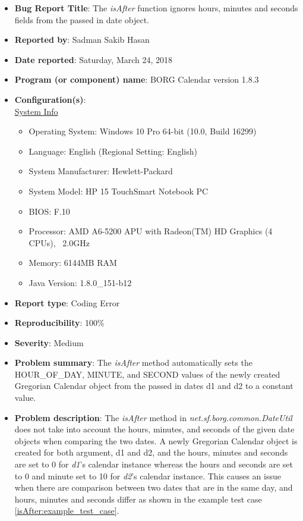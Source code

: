 \documentclass[fontsize=12pt,paper=letter,twoside]{scrartcl}
\begin{document}
\begin{itemize}
\item \textbf{Bug Report Title}: The \emph{isAfter} function ignores hours, minutes and seconds fields from the passed in date object.
\item \textbf{Reported by}: Sadman Sakib Hasan
\item \textbf{Date reported}: Saturday, March 24, 2018
\item \textbf{Program (or component) name}: BORG Calendar version 1.8.3
\item \textbf{Configuration(s)}:\\
\underline{System Info}
\begin{itemize}
\item{Operating System: Windows 10 Pro 64-bit (10.0, Build 16299)}
\item {Language: English (Regional Setting: English)}
\item {System Manufacturer: Hewlett-Packard}
\item {System Model: HP 15 TouchSmart Notebook PC}
\item {BIOS: F.10}
\item {Processor: AMD A6-5200 APU with Radeon(TM) HD Graphics (4 CPUs), ~2.0GHz }
\item {Memory: 6144MB RAM}
\item {Java Version: 1.8.0\_151-b12}
\end{itemize}
\item \textbf{Report type}: Coding Error
\item \textbf{Reproducibility}: 100\%
\item \textbf{Severity}: Medium
\item \textbf{Problem summary}: The \emph{isAfter} method automatically sets the HOUR\_OF\_DAY, MINUTE, and SECOND values of the newly created Gregorian Calendar object from the passed in dates d1 and d2 to a constant value.
\item \textbf{Problem description}: The \emph{isAfter} method in \emph{net.sf.borg.common.DateUtil} does not take into account the hours, minutes, and seconds of the given date objects when comparing the two dates. A newly Gregorian Calendar object is created for both argument, d1 and d2, and the hours, minutes and seconds are set to 0 for \emph{d1}'s calendar instance whereas the hours and seconds are set to 0 and minute set to 10 for \emph{d2}'s calendar instance. This causes an issue when there are comparison between two dates that are in the same day, and hours, minutes and seconds differ as shown in the example test case \ref{isAfter:example_test_case}.

\end{itemize}
\end{document}
